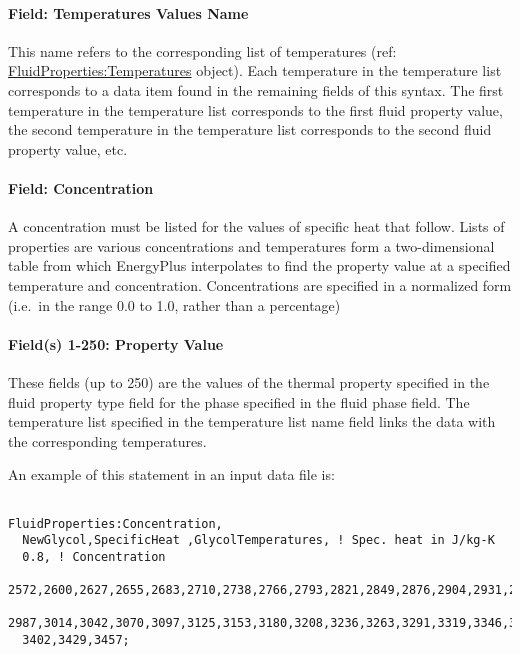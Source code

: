\paragraph{Field: Temperatures Values Name}\label{field-temperatures-values-name-2}

This name refers to the corresponding list of temperatures (ref: \hyperref[fluidpropertiestemperatures]{FluidProperties:Temperatures} object). Each temperature in the temperature list corresponds to a data item found in the remaining fields of this syntax. The first temperature in the temperature list corresponds to the first fluid property value, the second temperature in the temperature list corresponds to the second fluid property value, etc.

\paragraph{Field: Concentration}\label{field-concentration}

A concentration must be listed for the values of specific heat that follow. Lists of properties are various concentrations and temperatures form a two-dimensional table from which EnergyPlus interpolates to find the property value at a specified temperature and concentration. Concentrations are specified in a normalized form (i.e.~in the range 0.0 to 1.0, rather than a percentage)

\paragraph{Field(s) 1-250: Property Value}\label{fields-1-250-property-value-2}

These fields (up to 250) are the values of the thermal property specified in the fluid property type field for the phase specified in the fluid phase field. The temperature list specified in the temperature list name field links the data with the corresponding temperatures.

An example of this statement in an input data file is:

\begin{lstlisting}

FluidProperties:Concentration,
  NewGlycol,SpecificHeat ,GlycolTemperatures, ! Spec. heat in J/kg-K
  0.8, ! Concentration
  2572,2600,2627,2655,2683,2710,2738,2766,2793,2821,2849,2876,2904,2931,2959,
  2987,3014,3042,3070,3097,3125,3153,3180,3208,3236,3263,3291,3319,3346,3374,
  3402,3429,3457;
\end{lstlisting}